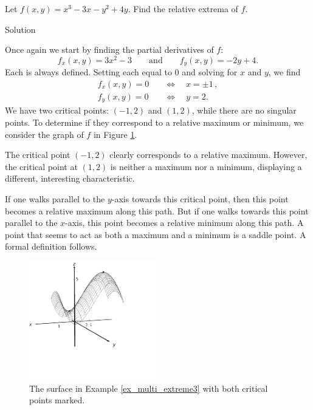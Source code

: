 \begin{example}\label{ex_multi_extreme3}
Let $f(x,y) = x^3-3x-y^2+4y$. Find the relative extrema of $f$.

Solution 

Once again we start by finding the partial derivatives of $f$:
$$f_x(x,y) = 3x^2-3\qquad \text{and} \qquad f_y(x,y) = -2y+4.$$
Each is always defined. Setting each equal to 0 and solving for $x$ and $y$, we find
\begin{align*}
f_x(x,y) = 0 \quad & \Leftrightarrow \quad x = \pm 1\,,\\
f_y(x,y) = 0 \quad & \Leftrightarrow \quad y = 2.
\end{align*}
We have two critical points: $(-1,2)$ and $(1,2)$, while there are no singular points. To determine if they correspond to a relative maximum or minimum, we consider the graph of $f$ in Figure \ref{fig_multi_var_25}.


The critical point $(-1,2)$ clearly corresponds to a relative maximum. However, the critical point at $(1,2)$ is neither a maximum nor a minimum, displaying a different, interesting characteristic. 

If one walks parallel to the $y$-axis towards this critical point, then this point becomes a relative maximum along this path. But if one walks towards this point parallel to the $x$-axis, this point becomes a relative minimum along this path. A point that seems to act as both a maximum and a minimum is a saddle point. A formal definition follows.

\begin{figure}[H]
	\begin{center}
			\includegraphics[width=0.5\textwidth]{fig_multi_var_25}
	\caption{The surface in Example \ref{ex_multi_extreme3} with both critical points marked.}
	\label{fig_multi_var_25}
	\end{center}
\end{figure}
\end{example}

